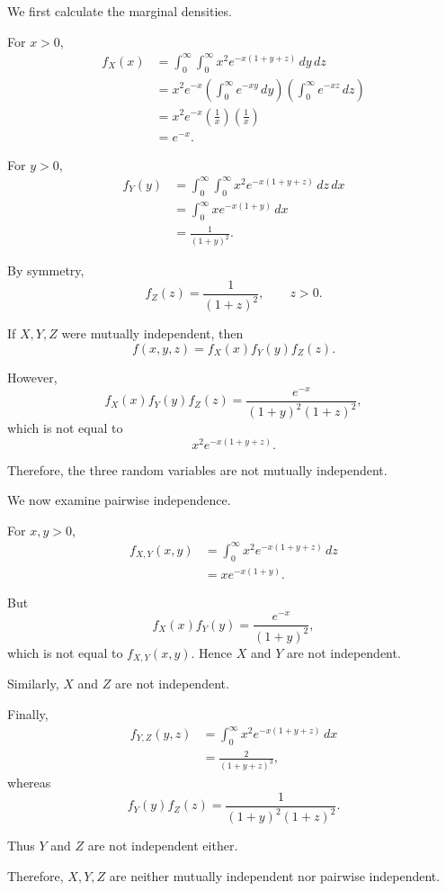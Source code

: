 \documentclass[11pt]{article}
\newenvironment{solution}{
    \par
    \begin{tcolorbox}[
        colback=white,
        colframe=uwgold,
        boxrule=0.7pt,
        arc=2mm,
        left=3mm,
        right=3mm,
        top=2mm,
        bottom=2mm,
        breakable,
        before skip=0.5em,
        after skip=1em,
        title=\textbf{Solution},
        coltitle=uwpurple,
        fonttitle=\bfseries
    ]
}{
    \end{tcolorbox}
}
\begin{document}
\begin{solution}

We first calculate the marginal densities.

For \(x>0\),
\[
\begin{aligned}
f_X(x)
&=
\int_0^\infty
\int_0^\infty
x^2e^{-x(1+y+z)}
\,dy\,dz\\
&=
x^2e^{-x}
\left(
\int_0^\infty e^{-xy}\,dy
\right)
\left(
\int_0^\infty e^{-xz}\,dz
\right)\\
&=
x^2e^{-x}
\left(\frac1x\right)
\left(\frac1x\right)\\
&=
e^{-x}.
\end{aligned}
\]

For \(y>0\),
\[
\begin{aligned}
f_Y(y)
&=
\int_0^\infty
\int_0^\infty
x^2e^{-x(1+y+z)}
\,dz\,dx\\
&=
\int_0^\infty
xe^{-x(1+y)}\,dx\\
&=
\frac{1}{(1+y)^2}.
\end{aligned}
\]

By symmetry,
\[
f_Z(z)=\frac{1}{(1+z)^2},
\qquad z>0.
\]

If \(X,Y,Z\) were mutually independent, then
\[
f(x,y,z)
=
f_X(x)f_Y(y)f_Z(z).
\]

However,
\[
f_X(x)f_Y(y)f_Z(z)
=
\frac{e^{-x}}
{(1+y)^2(1+z)^2},
\]
which is not equal to
\[
x^2e^{-x(1+y+z)}.
\]

Therefore, the three random variables are not mutually independent.

We now examine pairwise independence.

For \(x,y>0\),
\[
\begin{aligned}
f_{X,Y}(x,y)
&=
\int_0^\infty
x^2e^{-x(1+y+z)}\,dz\\
&=
xe^{-x(1+y)}.
\end{aligned}
\]

But
\[
f_X(x)f_Y(y)
=
\frac{e^{-x}}{(1+y)^2},
\]
which is not equal to \(f_{X,Y}(x,y)\). Hence \(X\) and \(Y\) are not
independent.

Similarly, \(X\) and \(Z\) are not independent.

Finally,
\[
\begin{aligned}
f_{Y,Z}(y,z)
&=
\int_0^\infty
x^2e^{-x(1+y+z)}\,dx\\
&=
\frac{2}{(1+y+z)^3},
\end{aligned}
\]
whereas
\[
f_Y(y)f_Z(z)
=
\frac{1}{(1+y)^2(1+z)^2}.
\]

Thus \(Y\) and \(Z\) are not independent either.

Therefore, \(X,Y,Z\) are neither mutually independent nor pairwise
independent.

\end{solution}
\end{document}
